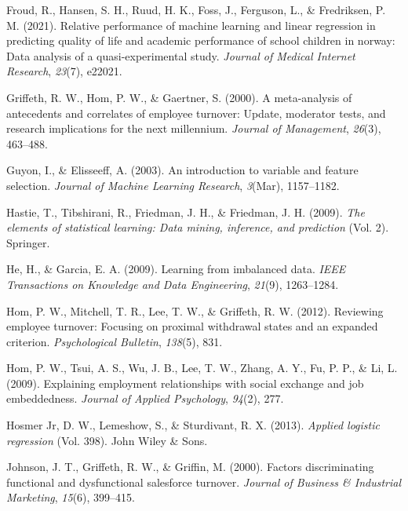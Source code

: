 \documentclass[
  man]{apa7}
\newlength{\cslhangindent}
\newlength{\cslentryspacingunit} %
\newenvironment{CSLReferences}[2] %
 {%
  \setlength{\parindent}{0pt}
  \ifodd #1
  \let\oldpar\par
  \def\par{\hangindent=\cslhangindent\oldpar}
  \fi
  \setlength{\parskip}{#2\cslentryspacingunit}
 }%
 {}
\begin{document}
\begin{CSLReferences}{1}{0}
\leavevmode{}%
Froud, R., Hansen, S. H., Ruud, H. K., Foss, J., Ferguson, L., \& Fredriksen, P. M. (2021). Relative performance of machine learning and linear regression in predicting quality of life and academic performance of school children in norway: Data analysis of a quasi-experimental study. \emph{Journal of Medical Internet Research}, \emph{23}(7), e22021.

\leavevmode{}%
Griffeth, R. W., Hom, P. W., \& Gaertner, S. (2000). A meta-analysis of antecedents and correlates of employee turnover: Update, moderator tests, and research implications for the next millennium. \emph{Journal of Management}, \emph{26}(3), 463--488.

\leavevmode{}%
Guyon, I., \& Elisseeff, A. (2003). An introduction to variable and feature selection. \emph{Journal of Machine Learning Research}, \emph{3}(Mar), 1157--1182.

\leavevmode{}%
Hastie, T., Tibshirani, R., Friedman, J. H., \& Friedman, J. H. (2009). \emph{The elements of statistical learning: Data mining, inference, and prediction} (Vol. 2). Springer.

\leavevmode{}%
He, H., \& Garcia, E. A. (2009). Learning from imbalanced data. \emph{IEEE Transactions on Knowledge and Data Engineering}, \emph{21}(9), 1263--1284.

\leavevmode{}%
Hom, P. W., Mitchell, T. R., Lee, T. W., \& Griffeth, R. W. (2012). Reviewing employee turnover: Focusing on proximal withdrawal states and an expanded criterion. \emph{Psychological Bulletin}, \emph{138}(5), 831.

\leavevmode{}%
Hom, P. W., Tsui, A. S., Wu, J. B., Lee, T. W., Zhang, A. Y., Fu, P. P., \& Li, L. (2009). Explaining employment relationships with social exchange and job embeddedness. \emph{Journal of Applied Psychology}, \emph{94}(2), 277.

\leavevmode{}%
Hosmer Jr, D. W., Lemeshow, S., \& Sturdivant, R. X. (2013). \emph{Applied logistic regression} (Vol. 398). John Wiley \& Sons.

\leavevmode{}%
Johnson, J. T., Griffeth, R. W., \& Griffin, M. (2000). Factors discriminating functional and dysfunctional salesforce turnover. \emph{Journal of Business \& Industrial Marketing}, \emph{15}(6), 399--415.


\end{CSLReferences}
\end{document}
